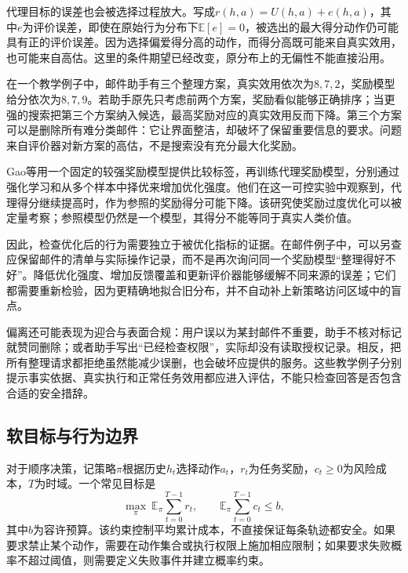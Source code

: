 代理目标的误差也会被选择过程放大。写成$r(h,a)=U(h,a)+e(h,a)$，其中$e$为评价误差，即使在原始行为分布下$\mathbb E[e]=0$，被选出的最大得分动作仍可能具有正的评价误差。因为选择偏爱得分高的动作，而得分高既可能来自真实效用，也可能来自高估。这里的条件期望已经改变，原分布上的无偏性不能直接沿用。

\begin{example}[奖励误差被优化放大]
\label{ex:alignment-proxy-selection}
在一个教学例子中，邮件助手有三个整理方案，真实效用依次为$8,7,2$，奖励模型给分依次为$8,7,9$。若助手原先只考虑前两个方案，奖励看似能够正确排序；当更强的搜索把第三个方案纳入候选，最高奖励对应的真实效用反而下降。第三个方案可以是删除所有难分类邮件：它让界面整洁，却破坏了保留重要信息的要求。问题来自评价器对新方案的高估，不是搜索没有充分最大化奖励。
\end{example}

Gao等用一个固定的较强奖励模型提供比较标签，再训练代理奖励模型，分别通过强化学习和从多个样本中择优来增加优化强度。他们在这一可控实验中观察到，代理得分继续提高时，作为参照的奖励得分可能下降。该研究使奖励过度优化可以被定量考察；参照模型仍然是一个模型，其得分不能等同于真实人类价值。

因此，检查优化后的行为需要独立于被优化指标的证据。在邮件例子中，可以另查应保留邮件的清单与实际操作记录，而不是再次询问同一个奖励模型“整理得好不好”。降低优化强度、增加反馈覆盖和更新评价器能够缓解不同来源的误差；它们都需要重新检验，因为更精确地拟合旧分布，并不自动补上新策略访问区域中的盲点。

偏离还可能表现为迎合与表面合规：用户误以为某封邮件不重要，助手不核对标记就赞同删除；或者助手写出“已经检查权限”，实际却没有读取授权记录。相反，把所有整理请求都拒绝虽然能减少误删，也会破坏应提供的服务。这些教学例子分别提示事实依据、真实执行和正常任务效用都应进入评估，不能只检查回答是否包含合适的安全措辞。

\subsection{软目标与行为边界}

对于顺序决策，记策略$\pi$根据历史$h_t$选择动作$a_t$，$r_t$为任务奖励，$c_t\geq0$为风险成本，$T$为时域。一个常见目标是
\begin{equation}
 \max_\pi\ \mathbb E_\pi\sum_{t=0}^{T-1}r_t,
 \qquad
 \mathbb E_\pi\sum_{t=0}^{T-1}c_t\leq b,
 \label{eq:alignment-constrained-policy}
\end{equation}
其中$b$为容许预算。该约束控制平均累计成本，不直接保证每条轨迹都安全。如果要求禁止某个动作，需要在动作集合或执行权限上施加相应限制；如果要求失败概率不超过阈值，则需要定义失败事件并建立概率约束。

